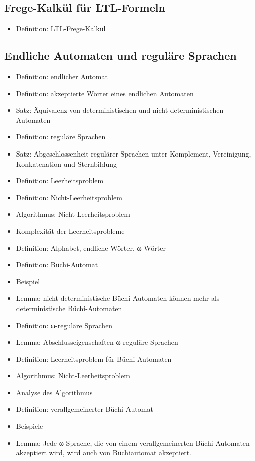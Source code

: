 \documentclass[8pt,fleqn,a4paper,twoside]{article}
\begin{document}
\begin{multicols}{2}
    \subsection{Frege-Kalkül für LTL-Formeln} %
    \label{sub:frege_kalkül_für_ltl_formeln}
      \begin{itemize}
        \item Definition: LTL-Frege-Kalkül
      \end{itemize}

    \subsection{Endliche Automaten und reguläre Sprachen} %
    \label{sub:endliche_automaten_und_reguläre_sprachen}
      \begin{itemize}
        \item Definition: endlicher Automat
        \item Definition: akzeptierte Wörter eines endlichen Automaten
        \item Satz: Äquivalenz von deterministischen und nicht-deterministischen Automaten
        \item Definition: reguläre Sprachen
        \item Satz: Abgeschlossenheit regulärer Sprachen unter Komplement, Vereinigung, Konkatenation und Sternbildung
        \item Definition: Leerheitsproblem
        \item Definition: Nicht-Leerheitsproblem
        \item Algorithmus: Nicht-Leerheitsproblem
        \item Komplexität der Leerheitsprobleme
        \item Definition: Alphabet, endliche Wörter, ω-Wörter
        \item Definition: Büchi-Automat
        \item Beispiel
        \item Lemma: nicht-deterministische Büchi-Automaten können mehr als deterministische Büchi-Automaten
        \item Definition: ω-reguläre Sprachen
        \item Lemma: Abschlusseigenschaften ω-reguläre Sprachen
        \item Definition: Leerheitsproblem für Büchi-Automaten
        \item Algorithmus: Nicht-Leerheitsproblem
        \item Analyse des Algorithmus
        \item Definition: verallgemeinerter Büchi-Automat
        \item Beispiele
        \item Lemma: Jede ω-Sprache, die von einem verallgemeinerten Büchi-Automaten akzeptiert wird, wird auch von Büchiautomat akzeptiert.
      \end{itemize}


\end{multicols}
\end{document}
